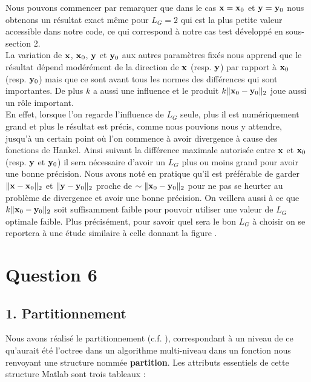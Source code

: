 \documentclass[10pt]{article}
\begin{document}

\begin{multicols}{2}

Nous pouvons commencer par remarquer que dans le cas ${\bf x}={\bf x}_0$ et ${\bf y}={\bf y}_0$ nous obtenons un résultat exact même pour $L_G=2$ qui est la plus petite valeur accessible dans notre code, ce qui correspond à notre cas test développé en sous-section 2.\\
\indent
La variation de ${\bf x}$, ${\bf x}_0$, ${\bf y}$ et ${\bf y}_0$ aux autres paramètres fixés nous apprend que le résultat dépend modérément de la direction de ${\bf x}$ (resp. ${\bf y}$) par rapport à ${\bf x}_0$ (resp. ${\bf y}_0$) mais que ce sont avant tous les normes des différences qui sont importantes. De plus $k$ a aussi une influence et le produit $k\|{\bf x}_0-{\bf y}_0\|_{2}$ joue aussi un rôle important. \\
\indent
En effet, lorsque l'on regarde l'influence de $L_G$ seule, plus il est numériquement grand et plus le résultat est précis, comme nous pouvions nous y attendre, jusqu'à un certain point où l'on commence à avoir divergence à cause des fonctions de Hankel. Ainsi suivant la différence maximale autorisée entre ${\bf x}$ et ${\bf x}_0$ (resp. ${\bf y}$ et ${\bf y}_0$) il sera nécessaire d'avoir un $L_G$ plus ou moins grand pour avoir une bonne précision. Nous avons noté en pratique qu'il est préférable de garder $\|{\bf x}-{\bf x}_0\|_{2}$ et $\|{\bf y}-{\bf y}_0\|_{2}$ proche de $ \sim \|{\bf x}_0 - {\bf y}_0\|_{2}$ pour ne pas se heurter au problème de divergence et avoir une bonne précision. On veillera aussi à ce que $k\|{\bf x}_0-{\bf y}_0\|_{2}$ soit suffisamment faible pour pouvoir utiliser une valeur de $L_G$ optimale faible. Plus précisément, pour savoir quel sera le bon $L_G$ à choisir on se reportera à une étude similaire à celle donnant la figure .

\vspace*{11pt}


\section*{Question 6}

\subsection*{1. Partitionnement}

Nous avons réalisé le partitionnement (c.f. ), correspondant à un niveau de ce qu'aurait été l'octree dans un algorithme multi-niveau dans un fonction nous renvoyant une structure nommée \textbf{partition}. Les attributs essentiels de cette structure Matlab sont trois tableaux : \\


\end{multicols}
\end{document}
